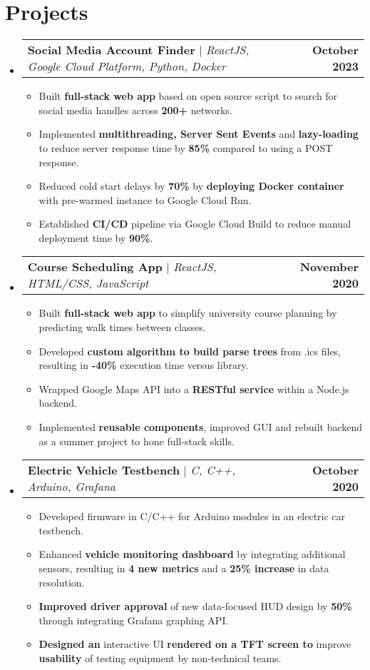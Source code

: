 \documentclass[letterpaper,11pt]{article}
\makeatletter
\newcommand{\resumeItem}[1]{
  \item\small{
    {#1 \vspace{-2pt}}
  }
}
\newcommand{\resumeProjectHeading}[2]{
    \item
    \begin{tabular*}{1.001\textwidth}{l@{\extracolsep{\fill}}r}
      \small#1 & \textbf{\small #2}\\
    \end{tabular*}\vspace{-7pt}
}
\newcommand{\resumeSubHeadingListStart}{\begin{itemize}[leftmargin=0.0in, label={}]}
\newcommand{\resumeSubHeadingListEnd}{\end{itemize}}
\newcommand{\resumeItemListStart}{\begin{itemize}}
\newcommand{\resumeItemListEnd}{\end{itemize}\vspace{-5pt}}
\makeatother
\begin{document}
\section{Projects}
    \vspace{-5pt}
    \resumeSubHeadingListStart
      \resumeProjectHeading
          {\textbf{Social Media Account Finder} $|$ \emph{ ReactJS, Google Cloud Platform, Python, Docker}}{October 2023}
          \resumeItemListStart
            \resumeItem{Built \textbf{full-stack web app} based on open source script to search for social media handles across \textbf{200+} networks.}
            \resumeItem{Implemented \textbf{multithreading, Server Sent Events} and \textbf{lazy-loading} to reduce server response time by \textbf{85\%} compared to using a POST response.}
            \resumeItem{Reduced cold start delays by \textbf{70\%} by \textbf{deploying Docker container} with pre-warmed instance to Google Cloud Run.}
            \resumeItem{Established \textbf{CI/CD} pipeline via Google Cloud Build to reduce manual deployment time by \textbf{90\%}.}
          \resumeItemListEnd
          \vspace{-13pt}
      \resumeProjectHeading
          {\textbf{Course Scheduling App} $|$ \emph{ReactJS, HTML/CSS, JavaScript}}{November 2020}
          \resumeItemListStart
            \resumeItem{Built \textbf{full-stack web app} to simplify university course planning by predicting walk times between classes.}
            \resumeItem{Developed \textbf{custom algorithm to build parse trees} from .ics files, resulting in \textbf{-40\%} execution time versus library.}
            \resumeItem{Wrapped Google Maps API into a \textbf{RESTful service} within a Node.js backend.}
            \resumeItem{Implemented \textbf{reusable components}, improved GUI and rebuilt backend as a summer project to hone full-stack skills.}
          \resumeItemListEnd 
          \vspace{-13pt}
          \resumeProjectHeading
          {\textbf{Electric Vehicle Testbench} $|$ \emph{C, C++, Arduino, Grafana}}{October 2020}
          \resumeItemListStart
            \resumeItem{Developed firmware in C/C++ for Arduino modules in an electric car testbench.}
            \resumeItem{Enhanced \textbf{vehicle monitoring dashboard} by integrating additional sensors, resulting in \textbf{4 new metrics} and a \textbf{25\% increase} in data resolution.}
            \resumeItem{\textbf{Improved driver approval} of new data-focused HUD design by \textbf{50\%} through integrating Grafana graphing API.}
            \resumeItem{\textbf{Designed an }interactive UI\textbf{ rendered on a TFT screen to }improve \textbf{usability} of testing equipment by non-technical teams.}            
          \resumeItemListEnd 
    \resumeSubHeadingListEnd
\vspace{-15pt}
\end{document}
